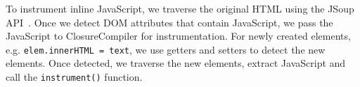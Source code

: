 To instrument inline JavaScript, we traverse the original HTML using the JSoup API~\cite{jsoup}.  Once we detect DOM attributes that contain JavaScript, we pass the JavaScript to ClosureCompiler for instrumentation.  
For newly created elements, e.g. {\tt elem.innerHTML = text}, we use getters and setters to detect the new elements.  Once detected, we traverse the new elements, extract JavaScript and call the {\tt instrument()} function.  
